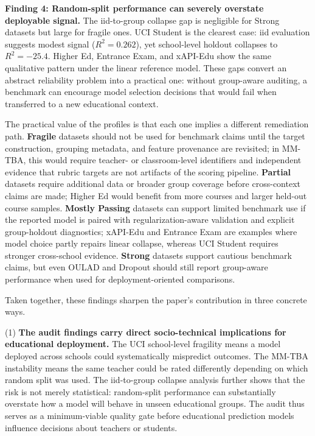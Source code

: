 \documentclass[10pt,letterpaper]{article}
\begin{document}
\textbf{Finding 4: Random-split performance can severely overstate deployable signal.} The iid-to-group collapse gap is negligible for Strong datasets but large for fragile ones. UCI Student is the clearest case: iid evaluation suggests modest signal ($R^2 = 0.262$), yet school-level holdout collapses to $R^2 = -25.4$. Higher Ed, Entrance Exam, and xAPI-Edu show the same qualitative pattern under the linear reference model. These gaps convert an abstract reliability problem into a practical one: without group-aware auditing, a benchmark can encourage model selection decisions that would fail when transferred to a new educational context.

The practical value of the profiles is that each one implies a different remediation path. \textbf{Fragile} datasets should not be used for benchmark claims until the target construction, grouping metadata, and feature provenance are revisited; in MM-TBA, this would require teacher- or classroom-level identifiers and independent evidence that rubric targets are not artifacts of the scoring pipeline. \textbf{Partial} datasets require additional data or broader group coverage before cross-context claims are made; Higher Ed would benefit from more courses and larger held-out course samples. \textbf{Mostly Passing} datasets can support limited benchmark use if the reported model is paired with regularization-aware validation and explicit group-holdout diagnostics; xAPI-Edu and Entrance Exam are examples where model choice partly repairs linear collapse, whereas UCI Student requires stronger cross-school evidence. \textbf{Strong} datasets support cautious benchmark claims, but even OULAD and Dropout should still report group-aware performance when used for deployment-oriented comparisons.

Taken together, these findings sharpen the paper's contribution in three concrete ways.

(1) \textbf{The audit findings carry direct socio-technical implications for educational deployment. } The UCI school-level fragility means a model deployed across schools could systematically mispredict outcomes. The MM-TBA instability means the same teacher could be rated differently depending on which random split was used. The iid-to-group collapse analysis further shows that the risk is not merely statistical: random-split performance can substantially overstate how a model will behave in unseen educational groups. The audit thus serves as a minimum-viable quality gate before educational prediction models influence decisions about teachers or students.
\end{document}
